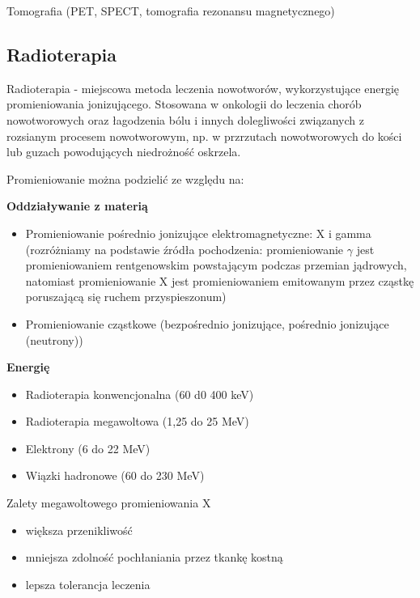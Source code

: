 \documentclass{article}
\begin{document}
Tomografia (PET, SPECT, tomografia rezonansu magnetycznego)

\subsection{Radioterapia}

Radioterapia - miejscowa metoda leczenia nowotworów, wykorzystujące energię promieniowania jonizującego. Stosowana w onkologii do leczenia chorób nowotworowych oraz łagodzenia bólu i innych dolegliwości związanych z rozsianym procesem nowotworowym, np. w przrzutach nowotworowych do kości lub guzach powodujących niedrożność oskrzela.

Promieniowanie można podzielić ze względu na:

\textbf{Oddziaływanie z materią}
\begin{itemize}
    \item Promieniowanie pośrednio jonizujące elektromagnetyczne: X i gamma (rozróżniamy na podstawie źródła pochodzenia: promieniowanie $\gamma$ jest promieniowaniem rentgenowskim powstającym podczas przemian jądrowych, natomiast promieniowanie X jest promieniowaniem emitowanym przez cząstkę poruszającą się ruchem przyspieszonum)
    \item Promieniowanie cząstkowe (bezpośrednio jonizujące, pośrednio jonizujące (neutrony))
\end{itemize}

\textbf{Energię}
\begin{itemize}
    \item Radioterapia konwencjonalna (60 d0 400 keV)
    \item Radioterapia megawoltowa (1,25 do 25 MeV)
    \item Elektrony (6 do 22 MeV)
    \item Wiązki hadronowe (60 do 230 MeV)
\end{itemize}

Zalety megawoltowego promieniowania X
\begin{itemize}
    \item większa przenikliwość
    \item mniejsza zdolność pochłaniania przez tkankę kostną
    \item lepsza tolerancja leczenia
\end{itemize}
\end{document}

